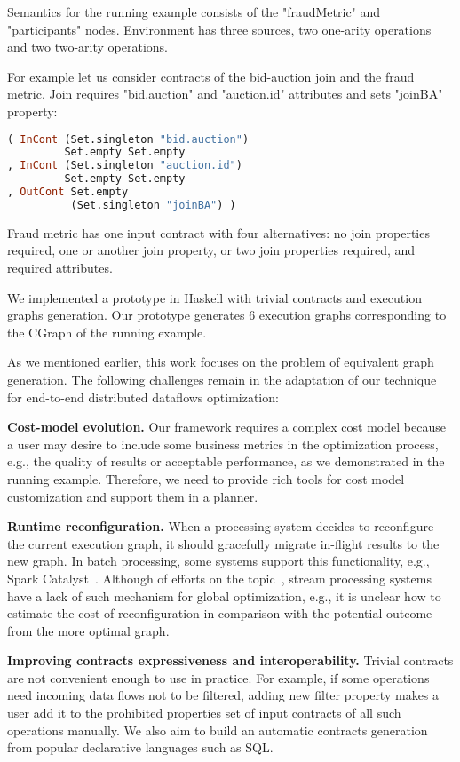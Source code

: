 Semantics for the running example consists of the "fraudMetric" and "participants" nodes.
Environment has three sources, two one-arity operations and two two-arity operations.

For example let us consider contracts of the bid-auction join and the fraud metric.
Join requires "bid.auction" and "auction.id" attributes and sets "joinBA" property:
\begin{lstlisting}[language=Haskell]
( InCont (Set.singleton "bid.auction")
         Set.empty Set.empty
, InCont (Set.singleton "auction.id")
         Set.empty Set.empty
, OutCont Set.empty
          (Set.singleton "joinBA") )
\end{lstlisting}

Fraud metric has one input contract with four alternatives: no join properties required, one or another join property, or two join properties required, and required attributes.

We implemented a prototype in Haskell with trivial contracts and execution graphs generation.
Our prototype generates 6 execution graphs corresponding to the CGraph of the running example.

As we mentioned earlier, this work focuses on the problem of equivalent graph generation. The following challenges remain in the adaptation of our technique for end-to-end distributed dataflows optimization:

\textbf{Cost-model evolution.}
Our framework requires a complex cost model because a user may desire to include some business metrics in the optimization process, e.g., the quality of results or acceptable performance, as we demonstrated in the running example. Therefore, we need to provide rich tools for cost model customization and support them in a planner. 

\textbf{Runtime reconfiguration.}
When a processing system decides to reconfigure the current execution graph, it should gracefully migrate in-flight results to the new graph. In batch processing, some systems support this functionality, e.g., Spark Catalyst~\cite{armbrust2015spark}. Although of efforts on the topic~\cite{10.14778/3329772.3329777, grulich2020grizzly}, stream processing systems have a lack of such mechanism for global optimization, e.g., it is unclear how to estimate the cost of reconfiguration in comparison with the potential outcome from the more optimal graph.

\textbf{Improving contracts expressiveness and interoperability.}
Trivial contracts are not convenient enough to use in practice.
For example, if some operations need incoming data flows not to be filtered, adding new filter property makes a user add it to the prohibited properties set of input contracts of all such operations manually. We also aim to build an automatic contracts generation from popular declarative languages such as SQL.